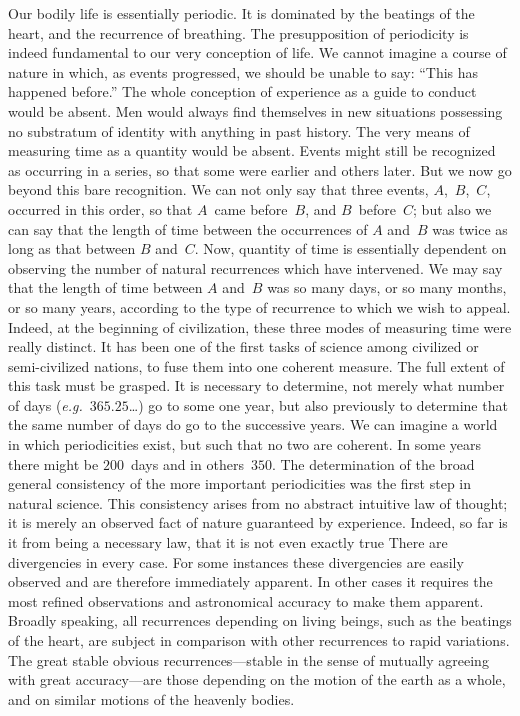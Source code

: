 \documentclass[12pt,leqno]{book}[2005/09/16]
\newcommand{\PageSep}[1]{\ignorespaces}
\newcommand{\eg}{\emph{e.g.}}
\begin{document}
Our bodily life is essentially periodic.
It is dominated by the beatings of the
heart, and the recurrence of breathing.
The presupposition of periodicity is indeed
fundamental to our very conception of life.
We cannot imagine a course of nature in
which, as events progressed, we should be
unable to say: ``This has happened before.''
The whole conception of experience as a guide
to conduct would be absent. Men would
always find themselves in new situations
possessing no substratum of identity with
anything in past history. The very means of
measuring time as a quantity would be absent.
Events might still be recognized as occurring
in a series, so that some were earlier and
others later. But we now go beyond this
bare recognition. We can not only say that
\PageSep{166}
%
three events, $A$,~$B$,~$C$, occurred in this order,
so that $A$~came before~$B$, and $B$~before~$C$;
but also we can say that the length of time
between the occurrences of $A$ and~$B$ was
twice as long as that between $B$ and~$C$. Now,
quantity of time is essentially dependent on
observing the number of natural recurrences
which have intervened. We may say
that the length of time between $A$ and~$B$ was
so many days, or so many months, or so
many years, according to the type of recurrence
to which we wish to appeal. Indeed,
at the beginning of civilization, these three
modes of measuring time were really distinct.
It has been one of the first tasks of science
among civilized or semi-civilized nations, to
fuse them into one coherent measure. The
full extent of this task must be grasped. It
is necessary to determine, not merely what
number of days (\eg~$365.25$\dots) go to some
one year, but also previously to determine that
the same number of days do go to the successive
years. We can imagine a world in
which periodicities exist, but such that no two
are coherent. In some years there might be
$200$~days and in others~$350$. The determination
of the broad general consistency of the
more important periodicities was the first step
in natural science. This consistency arises
from no abstract intuitive law of thought;
it is merely an observed fact of nature
\PageSep{167}
guaranteed by experience. Indeed, so far is
it from being a necessary law, that it is not
even exactly true There are divergencies in
every case. For some instances these divergencies
are easily observed and are therefore
immediately apparent. In other cases it requires
the most refined observations and
astronomical accuracy to make them apparent.
Broadly speaking, all recurrences depending
on living beings, such as the beatings
of the heart, are subject in comparison with
other recurrences to rapid variations. The
great stable obvious recurrences---stable in
the sense of mutually agreeing with great
accuracy---are those depending on the motion
of the earth as a whole, and on similar motions
of the heavenly bodies.
\end{document}
